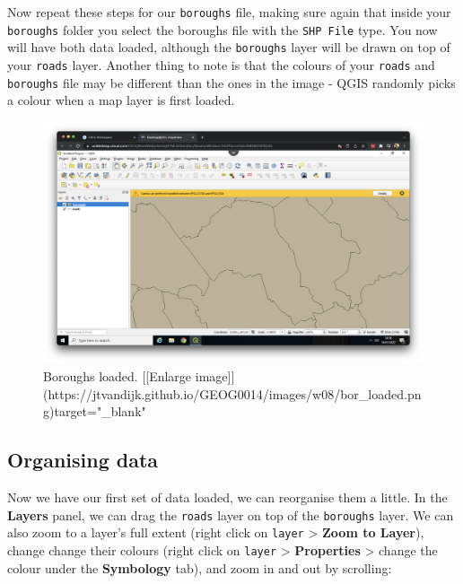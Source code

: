 \documentclass[
]{book}
\begin{document}
Now repeat these steps for our \texttt{boroughs} file, making sure again that inside your \texttt{boroughs} folder you select the boroughs file with the \texttt{SHP\ File} type. You now will have both data loaded, although the \texttt{boroughs} layer will be drawn on top of your \texttt{roads} layer. Another thing to note is that the colours of your \texttt{roads} and \texttt{boroughs} file may be different than the ones in the image - QGIS randomly picks a colour when a map layer is first loaded.

\begin{figure}

{\centering \includegraphics[width=850pt]{images/w08/bor_loaded} 

}

\caption{Boroughs loaded. [[Enlarge image]](https://jtvandijk.github.io/GEOG0014/images/w08/bor_loaded.png){target="_blank"}}\label{fig:bor-loaded}
\end{figure}

\hypertarget{organising-data}{%
\subsection*{Organising data}\label{organising-data}}

Now we have our first set of data loaded, we can reorganise them a little. In the \textbf{Layers} panel, we can drag the \texttt{roads} layer on top of the \texttt{boroughs} layer. We can also zoom to a layer's full extent (right click on \texttt{layer} \textgreater{} \textbf{Zoom to Layer}), change change their colours (right click on \texttt{layer} \textgreater{} \textbf{Properties} \textgreater{} change the colour under the \textbf{Symbology} tab), and zoom in and out by scrolling:
\end{document}
